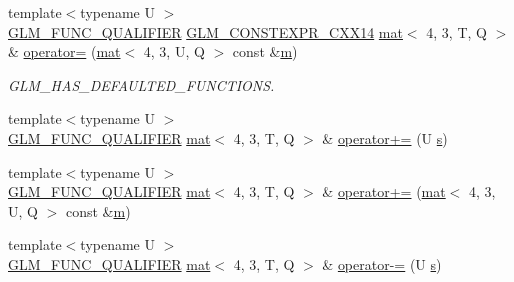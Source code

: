 \begin{DoxyCompactItemize}
\item 
{\footnotesize template$<$typename U $>$ }\\\mbox{\hyperlink{setup_8hpp_a33fdea6f91c5f834105f7415e2a64407}{G\+L\+M\+\_\+\+F\+U\+N\+C\+\_\+\+Q\+U\+A\+L\+I\+F\+I\+ER}} \mbox{\hyperlink{setup_8hpp_a4dd12abf5e1164bc57f3a34671d03844}{G\+L\+M\+\_\+\+C\+O\+N\+S\+T\+E\+X\+P\+R\+\_\+\+C\+X\+X14}} \mbox{\hyperlink{structglm_1_1mat}{mat}}$<$ 4, 3, T, Q $>$ \& \mbox{\hyperlink{structglm_1_1mat_3_014_00_013_00_01_t_00_01_q_01_4_aa924cf798f7324b172ca31f969fd02e4}{operator=}} (\mbox{\hyperlink{structglm_1_1mat}{mat}}$<$ 4, 3, U, Q $>$ const \&\mbox{\hyperlink{_s_d_l__opengl__glext_8h_af593500c283bf1a787a6f947f503a5c2}{m}})
\begin{DoxyCompactList}\small\item\em G\+L\+M\+\_\+\+H\+A\+S\+\_\+\+D\+E\+F\+A\+U\+L\+T\+E\+D\+\_\+\+F\+U\+N\+C\+T\+I\+O\+NS. \end{DoxyCompactList}\item 
{\footnotesize template$<$typename U $>$ }\\\mbox{\hyperlink{setup_8hpp_a33fdea6f91c5f834105f7415e2a64407}{G\+L\+M\+\_\+\+F\+U\+N\+C\+\_\+\+Q\+U\+A\+L\+I\+F\+I\+ER}} \mbox{\hyperlink{structglm_1_1mat}{mat}}$<$ 4, 3, T, Q $>$ \& \mbox{\hyperlink{structglm_1_1mat_3_014_00_013_00_01_t_00_01_q_01_4_ab093ab8d6e82815249f24bb79439fae2}{operator+=}} (U \mbox{\hyperlink{_s_d_l__opengl_8h_a4af680a6c683f88ed67b76f207f2e6e4}{s}})
\item 
{\footnotesize template$<$typename U $>$ }\\\mbox{\hyperlink{setup_8hpp_a33fdea6f91c5f834105f7415e2a64407}{G\+L\+M\+\_\+\+F\+U\+N\+C\+\_\+\+Q\+U\+A\+L\+I\+F\+I\+ER}} \mbox{\hyperlink{structglm_1_1mat}{mat}}$<$ 4, 3, T, Q $>$ \& \mbox{\hyperlink{structglm_1_1mat_3_014_00_013_00_01_t_00_01_q_01_4_aef2c1c92ecc7a7780ef06345d516a8ef}{operator+=}} (\mbox{\hyperlink{structglm_1_1mat}{mat}}$<$ 4, 3, U, Q $>$ const \&\mbox{\hyperlink{_s_d_l__opengl__glext_8h_af593500c283bf1a787a6f947f503a5c2}{m}})
\item 
{\footnotesize template$<$typename U $>$ }\\\mbox{\hyperlink{setup_8hpp_a33fdea6f91c5f834105f7415e2a64407}{G\+L\+M\+\_\+\+F\+U\+N\+C\+\_\+\+Q\+U\+A\+L\+I\+F\+I\+ER}} \mbox{\hyperlink{structglm_1_1mat}{mat}}$<$ 4, 3, T, Q $>$ \& \mbox{\hyperlink{structglm_1_1mat_3_014_00_013_00_01_t_00_01_q_01_4_ac8a6b92078e6005a122912cbfba7f108}{operator-\/=}} (U \mbox{\hyperlink{_s_d_l__opengl_8h_a4af680a6c683f88ed67b76f207f2e6e4}{s}})
\item 

\end{DoxyCompactItemize}
